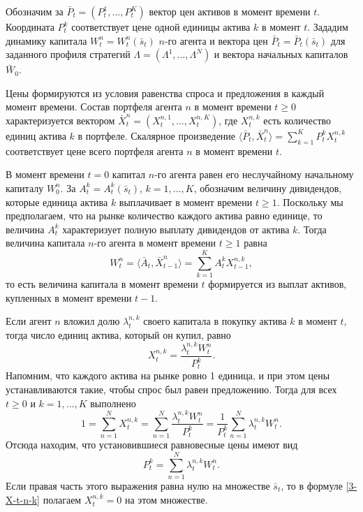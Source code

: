 \documentclass[a4paper,12pt,russian]{article} %
\theoremstyle{definition}
\begin{document}
Обозначим за $\bar P_t = (P_{t}^1,\ldots,P_{t}^K)$ вектор цен активов в момент времени $t$.
Координата $P_{t}^k$  соответствует цене одной единицы актива $k$ в момент $t$.
Зададим динамику капитала $W_t^n = W_t^n(  \bar s_{t} )$ $n$-го агента и вектора цен $\bar P_t= \bar P_t( \bar s_{t} )$ для заданного профиля стратегий $\Lambda=(\Lambda^1,\dots,\Lambda^N)$ и вектора начальных капиталов $\bar W_0$.

Цены формируются из условия равенства спроса и предложения в каждый момент времени. 
Состав портфеля агента $n$ в момент времени $t\ge0$ характеризуется вектором $ \bar X_t^n=(X_{t}^{n,1},\dots,X_{t}^{n,K})$, где $X_{t}^{n,k}$ есть количество единиц актива $k$ в портфеле.
Скалярное произведение $\langle \bar P_{t}, \bar X_{t}^{n}\rangle=\sum_{k=1}^{K}P_{t}^k X_{t}^{n,k}$ соответствует цене всего портфеля агента $n$ в момент времени $t$.

В момент времени $t=0$ капитал $n$-го агента равен его неслучайному начальному капиталу $W_{0}^{n}$.
За $A_{t}^k = A_{t}^k(  \bar s_{t} )$, $k=1,\dots,K$,  обозначим величину дивидендов, которые единица актива $k$ выплачивает в момент времени $t\ge 1$. Поскольку мы предполагаем, что на рынке количество каждого актива равно единице, то величина $A_{t}^k$ характеризует полную выплату дивидендов от актива $k$. Тогда величина капитала $n$-го агента 
в момент времени $t\ge1$ равна
\begin{equation}
W_{t}^{n}=\langle \bar A_{t}, \bar X_{t-1}^{n}\rangle=\sum_{k=1}^{K}A_{t}^k X_{t-1}^{n,k},
\label{2-W-t-n}%
\end{equation}
то есть величина капитала в момент времени $t$ формируется из выплат активов, купленных в момент времени $t-1$.

Если агент $n$ вложил долю $\lambda_{t}^{n,k}$ своего капитала в покупку актива $k$ в момент $t$, тогда число единиц актива, который он купил, равно
\begin{equation}
X_{t}^{n,k} = \frac{\lambda_{t}^{n,k} W_t^n}{P_{t}^k}. \label{3-X-t-n-k}
\end{equation}
Напомним, что каждого актива на рынке ровно 1 единица, и при этом цены устанавливаются такие, чтобы спрос был равен предложению. Тогда для всех $t\ge0$ и $k=1,\dots,K$ выполнено
\[
1 = \sum_{n=1}^{N}X_{t}^{n,k} 
= \sum_{n=1}^{N}\frac{\lambda_{t}^{n,k}W_{t}^{n}}{P_{t}^k}= \frac{1}{P_{t}^k} \sum_{n=1}^{N}\lambda_{t}^{n,k}W_{t}^{n}.
\]
Отсюда находим, что установившиеся равновесные цены имеют вид
\begin{equation}
P_{t}^k = \sum_{n=1}^{N}\lambda_{t}^{n,k}W_{t}^{n}. \label{4-P-t-k}
\end{equation}
Если правая часть этого выражения равна нулю на множестве  $\bar s_{t} $, то в формуле \eqref{3-X-t-n-k} полагаем $X_{t}^{n,k}=0$ на этом множестве.
\end{document}
